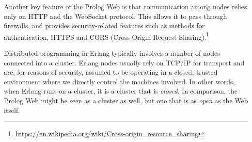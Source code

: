 \documentclass{tlp}
\begin{document}
Another key feature of the Prolog Web is that communication among nodes relies only on HTTP and the WebSocket protocol. This allows it to pass through firewalls, and provides security-related features such as methods for authentication, HTTPS and CORS (Cross-Origin Request Sharing).\footnote{\url{https://en.wikipedia.org/wiki/Cross-origin_resource_sharing}}

Distributed programming in Erlang typically involves a number of nodes connected into a cluster. Erlang nodes usually rely on TCP/IP for transport and are, for reasons of security, assumed to be operating in a closed, trusted environment where we directly control the machines involved. In other words, when Erlang runs on a cluster, it is a cluster that is \textit{closed}. In comparison, the Prolog Web might be seen as a cluster as well, but one that is as \textit{open} as the Web itself. %



%
%
%
%
%
\end{document}
